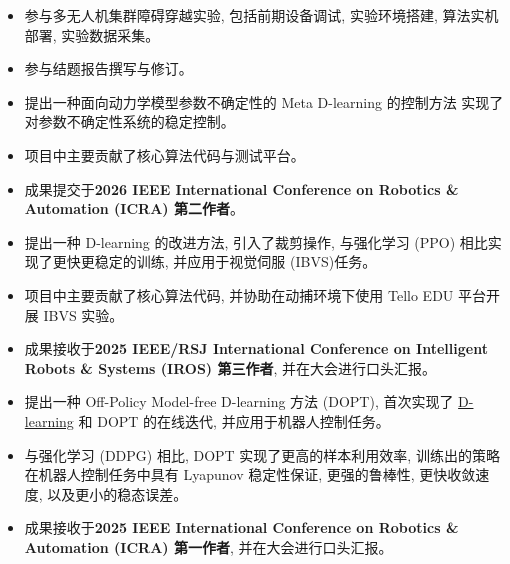 \begin{itemize}
  \item 参与多无人机集群障碍穿越实验, 包括前期设备调试, 实验环境搭建, 算法实机部署, 实验数据采集。
  \item 参与结题报告撰写与修订。
\end{itemize}

\begin{itemize}
  \item 提出一种面向动力学模型参数不确定性的 Meta D-learning 的控制方法 实现了对参数不确定性系统的稳定控制。
  \item 项目中主要贡献了核心算法代码与测试平台。
  \item 成果提交于\textcolor{ICBlue}{\textbf{2026 IEEE International Conference on Robotics \& Automation (ICRA) 第二作者}}。
\end{itemize}


\begin{itemize}
  \item 提出一种 D-learning 的改进方法, 引入了裁剪操作, 与强化学习 (PPO) 相比实现了更快更稳定的训练, 并应用于视觉伺服 (IBVS)任务。
  \item 项目中主要贡献了核心算法代码, 并协助在动捕环境下使用 Tello EDU 平台开展 IBVS 实验。
  \item 成果接收于\textcolor{ICBlue}{\textbf{2025 IEEE/RSJ International Conference on Intelligent Robots \& Systems (IROS) 第三作者}}, 并在大会进行口头汇报。
\end{itemize}


\begin{itemize}
  \item 提出一种 Off-Policy Model-free D-learning 方法 (DOPT), 首次实现了 \href{https://proceedings.mlr.press/v270/quan25a.html}{D-learning} 和 DOPT 的在线迭代, 并应用于机器人控制任务。
  \item 与强化学习 (DDPG) 相比, DOPT 实现了更高的样本利用效率, 训练出的策略在机器人控制任务中具有 Lyapunov 稳定性保证, 更强的鲁棒性, 更快收敛速度, 以及更小的稳态误差。
  \item 成果接收于\textcolor{ICBlue}{\textbf{2025 IEEE International Conference on Robotics \& Automation (ICRA) 第一作者}}, 并在大会进行口头汇报。
\end{itemize}

